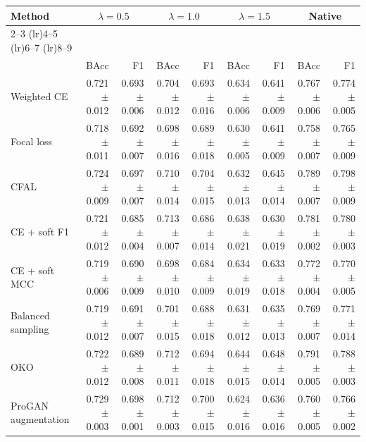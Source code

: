 \begin{tabular}{lrrrrrr|rr}
\toprule
Method & \multicolumn{2}{c}{$\lambda=0.5$} & \multicolumn{2}{c}{$\lambda=1.0$} & \multicolumn{2}{c}{$\lambda=1.5$} & \multicolumn{2}{c}{Native} \\ \cmidrule(lr){2--3} \cmidrule(lr){4--5} \cmidrule(lr){6--7} \cmidrule(lr){8--9}\\
 & BAcc & F1 & BAcc & F1 & BAcc & F1 & BAcc & F1\\
\midrule
Weighted CE & \num{0.721} $\pm$ \num{0.012} & \num{0.693} $\pm$ \num{0.006} & \num{0.704} $\pm$ \num{0.012} & \num{0.693} $\pm$ \num{0.016} & \num{0.634} $\pm$ \num{0.006} & \num{0.641} $\pm$ \num{0.009} & \num{0.767} $\pm$ \num{0.006} & \num{0.774} $\pm$ \num{0.005}\\
Focal loss & \num{0.718} $\pm$ \num{0.011} & \num{0.692} $\pm$ \num{0.007} & \num{0.698} $\pm$ \num{0.016} & \num{0.689} $\pm$ \num{0.018} & \num{0.630} $\pm$ \num{0.005} & \num{0.641} $\pm$ \num{0.009} & \num{0.758} $\pm$ \num{0.007} & \num{0.765} $\pm$ \num{0.009}\\
CFAL & \num{0.724} $\pm$ \num{0.009} & \num{0.697} $\pm$ \num{0.007} & \num{0.710} $\pm$ \num{0.014} & \num{0.704} $\pm$ \num{0.015} & \num{0.632} $\pm$ \num{0.013} & \num{0.645} $\pm$ \num{0.014} & \num{0.789} $\pm$ \num{0.007} & \num{0.798} $\pm$ \num{0.009}\\
CE + soft F1 & \num{0.721} $\pm$ \num{0.012} & \num{0.685} $\pm$ \num{0.004} & \num{0.713} $\pm$ \num{0.007} & \num{0.686} $\pm$ \num{0.014} & \num{0.638} $\pm$ \num{0.021} & \num{0.630} $\pm$ \num{0.019} & \num{0.781} $\pm$ \num{0.002} & \num{0.780} $\pm$ \num{0.003}\\
CE + soft MCC & \num{0.719} $\pm$ \num{0.006} & \num{0.690} $\pm$ \num{0.009} & \num{0.698} $\pm$ \num{0.010} & \num{0.684} $\pm$ \num{0.009} & \num{0.634} $\pm$ \num{0.019} & \num{0.633} $\pm$ \num{0.018} & \num{0.772} $\pm$ \num{0.004} & \num{0.770} $\pm$ \num{0.005}\\
Balanced sampling & \num{0.719} $\pm$ \num{0.012} & \num{0.691} $\pm$ \num{0.007} & \num{0.701} $\pm$ \num{0.015} & \num{0.688} $\pm$ \num{0.018} & \num{0.631} $\pm$ \num{0.012} & \num{0.635} $\pm$ \num{0.013} & \num{0.769} $\pm$ \num{0.007} & \num{0.771} $\pm$ \num{0.014}\\
OKO & \num{0.722} $\pm$ \num{0.012} & \num{0.689} $\pm$ \num{0.008} & \num{0.712} $\pm$ \num{0.011} & \num{0.694} $\pm$ \num{0.018} & \num{0.644} $\pm$ \num{0.015} & \num{0.648} $\pm$ \num{0.014} & \num{0.791} $\pm$ \num{0.005} & \num{0.788} $\pm$ \num{0.003}\\
ProGAN augmentation & \num{0.729} $\pm$ \num{0.003} & \num{0.698} $\pm$ \num{0.001} & \num{0.712} $\pm$ \num{0.003} & \num{0.700} $\pm$ \num{0.015} & \num{0.624} $\pm$ \num{0.016} & \num{0.636} $\pm$ \num{0.016} & \num{0.760} $\pm$ \num{0.005} & \num{0.766} $\pm$ \num{0.002}\\
\bottomrule
\end{tabular}
